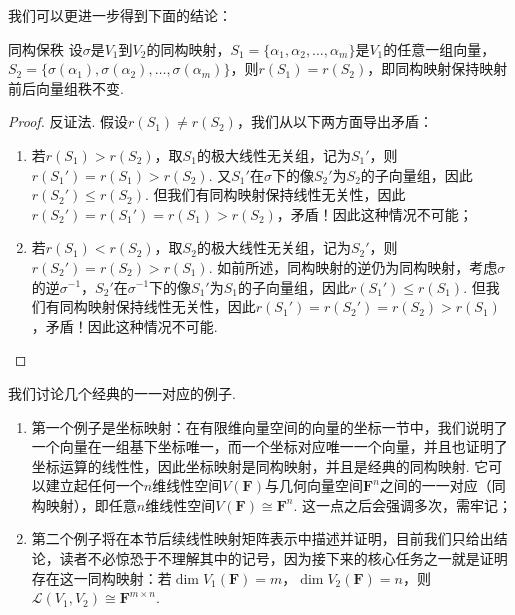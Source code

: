 \begin{enumerate}
          我们可以更进一步得到下面的结论：
          \begin{theorem}{}{同构保秩}
              设$\sigma$是$V_1$到$V_2$的同构映射，$S_1=\{\alpha_1,\alpha_2,\ldots,\alpha_m\}$是$V_1$的任意一组向量，$S_2=\{\sigma(\alpha_1),\sigma(\alpha_2),\ldots,\sigma(\alpha_m)\}$，则$r(S_1)=r(S_2)$，即同构映射保持映射前后向量组秩不变.
          \end{theorem}
          \begin{proof}
              反证法. 假设$r(S_1)\neq r(S_2)$，我们从以下两方面导出矛盾：
              \begin{enumerate}
                  \item 若$r(S_1)>r(S_2)$，取$S_1$的极大线性无关组，记为$S_1'$，则$r(S_1')=r(S_1)>r(S_2)$. 又$S_1'$在$\sigma$下的像$S_2'$为$S_2$的子向量组，因此$r(S_2')\leqslant r(S_2)$. 但我们有同构映射保持线性无关性，因此$r(S_2')=r(S_1')=r(S_1)>r(S_2)$，矛盾！因此这种情况不可能；

                  \item 若$r(S_1)<r(S_2)$，取$S_2$的极大线性无关组，记为$S_2'$，则$r(S_2')=r(S_2)>r(S_1)$. 如前所述，同构映射的逆仍为同构映射，考虑$\sigma$的逆$\sigma^{-1}$，$S_2'$在$\sigma^{-1}$下的像$S_1'$为$S_1$的子向量组，因此$r(S_1')\leqslant r(S_1)$. 但我们有同构映射保持线性无关性，因此$r(S_1')=r(S_2')=r(S_2)>r(S_1)$，矛盾！因此这种情况不可能.
              \end{enumerate}
          \end{proof}
\end{enumerate}

我们讨论几个经典的一一对应的例子.
\begin{enumerate}
    \item 第一个例子是坐标映射：在有限维向量空间的向量的坐标一节中，我们说明了一个向量在一组基下坐标唯一，而一个坐标对应唯一一个向量，并且也证明了坐标运算的线性性，因此坐标映射是同构映射，并且是经典的同构映射. 它可以建立起任何一个$n$维线性空间$V(\mathbf{F})$与几何向量空间$\mathbf{F}^n$之间的一一对应（同构映射），即任意$n$维线性空间$V(\mathbf{F})\cong\mathbf{F}^n$. 这一点之后会强调多次，需牢记；

    \item 第二个例子将在本节后续线性映射矩阵表示中描述并证明，目前我们只给出结论，读者不必惊恐于不理解其中的记号，因为接下来的核心任务之一就是证明存在这一同构映射：若$\dim V_1(\mathbf{F})=m$，$\dim V_2(\mathbf{F})=n$，则$\mathcal{L}(V_1,V_2) \cong \mathbf{F}^{m \times n}$.
\end{enumerate}


